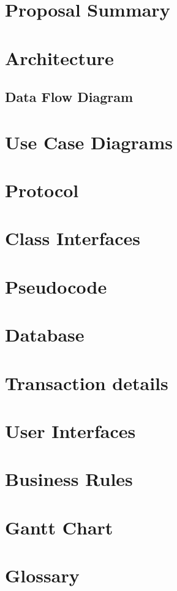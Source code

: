 \chapter{Proposal Summary}


\chapter{Architecture}


\section{Data Flow Diagram}


\chapter{Use Case Diagrams}


\chapter{Protocol}


\chapter{Class Interfaces}


\chapter{Pseudocode}


\chapter{Database}


\chapter{Transaction details}


\chapter{User Interfaces}


\chapter{Business Rules}


%

\chapter{Gantt Chart}


\chapter{Glossary}

